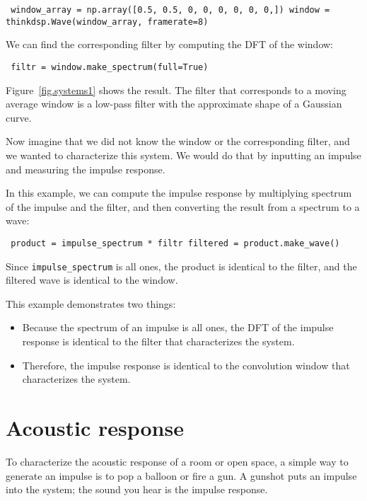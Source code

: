 \documentclass[12pt]{book} \usepackage[width=5.5in,height=8.5in, hmarginratio=3:2,vmarginratio=1:1]{geometry}
\begin{document}
\begin{verbatim} window_array = np.array([0.5, 0.5, 0, 0, 0, 0, 0, 0,]) window = thinkdsp.Wave(window_array, framerate=8) \end{verbatim} 

We can find the corresponding filter by computing the DFT of the window: 

\begin{verbatim} filtr = window.make_spectrum(full=True) \end{verbatim} 

Figure~\ref{fig.systems1} shows the result. The filter that corresponds to a moving average window is a low-pass filter with the approximate shape of a Gaussian curve. 

Now imagine that we did not know the window or the corresponding filter, and we wanted to characterize this system. We would do that by inputting an impulse and measuring the impulse response. 

In this example, we can compute the impulse response by multiplying spectrum of the impulse and the filter, and then converting the result from a spectrum to a wave: 

\begin{verbatim} product = impulse_spectrum * filtr filtered = product.make_wave() \end{verbatim} 

Since \verb"impulse_spectrum" is all ones, the product is identical to the filter, and the filtered wave is identical to the window. 

This example demonstrates two things: 

\begin{itemize} 

\item Because the spectrum of an impulse is all ones, the DFT of the impulse response is identical to the filter that characterizes the system. 

\item Therefore, the impulse response is identical to the convolution window that characterizes the system. 

\end{itemize} 

\section{Acoustic response} \label{response} 

To characterize the acoustic response of a room or open space, a simple way to generate an impulse is to pop a balloon or fire a gun. A gunshot puts an impulse into the system; the sound you hear is the impulse response. 
\end{document}
